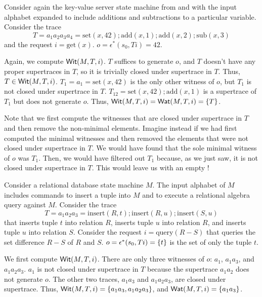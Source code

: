 \begin{example}
  \newcommand{\Mget}{\text{get}}
  \newcommand{\Mset}{\text{set}}
  \newcommand{\Madd}{\text{add}}
  \newcommand{\Msub}{\text{sub}}
  Consider again the key-value server state machine from
   and  with the input
  alphabet expanded to include additions and subtractions to a particular
  variable. Consider the trace
  \[
    T = a_1 a_2 a_3 a_4 = \Mset(x, 42); \Madd(x, 1); \Madd(x, 2); \Msub(x, 3)
  \]
  and the request $i = \Mget(x)$. $o = \epsilon^*(s_0, Ti) = 42$.

  Again, we compute $\textsf{Wit}(M, T, i)$. $T$ suffices to generate $o$, and $T$
  doesn't have any proper supertraces in $T$, so it is trivially closed under
  supertrace in $T$. Thus, $T \in \textsf{Wit}(M, T, i)$.
  $T_1 = a_1 = \Mset(x, 42)$ is the only other witness of $o$, but $T_1$ is not
  closed under supertrace in $T$. $T_{12} = \Mset(x, 42); \Madd(x, 1)$ is a
  supertrace of $T_1$ but does not generate $o$.
  Thus, $\textsf{Wit}(M, T, i) = \textsf{Wat}(M, T, i) = \{T\}$.

  Note that we first compute the witnesses that are closed under supertrace in
  $T$ and then remove the non-minimal elements. Imagine instead if we had first
  computed the minimal witnesses and then removed the elements that were not
  closed under supertrace in $T$. We would have found that the sole minimal
  witness of $o$ was $T_1$. Then, we would have filtered out $T_1$ because, as
  we just saw, it is not closed under supertrace in $T$. This would leave us
  with an empty \watprovenance{}!
\end{example}

\begin{example}
  \newcommand{\Mins}{\text{insert}}
  \newcommand{\Mquery}{\text{query}}
  Consider a relational database state machine $M$. The input alphabet of $M$
  includes commands to insert a tuple into $M$ and to execute a relational
  algebra query against $M$. Consider the trace
  \[
    T = a_1 a_2 a_3 = \Mins(R, t); \Mins(R, u); \Mins(S, u)
  \]
  that inserts tuple $t$ into relation $R$, inserts tuple $u$ into relation
  $R$, and inserts tuple $u$ into relation $S$. Consider the request $i =
  \Mquery(R - S)$ that queries the set difference $R - S$ of $R$ and $S$. $o =
  \epsilon^*(s_0, Ti) = \{t\}$ is the set of only the tuple $t$.

  We first compute $\textsf{Wit}(M, T, i)$. There are only three witnesses of $o$:
  $a_1$, $a_1a_3$, and $a_1a_2a_3$.  $a_1$ is not closed under supertrace in
  $T$ because the supertrace $a_1a_2$ does not generate $o$. The other two
  traces, $a_1a_3$ and $a_1a_2a_3$, are closed under supertrace. Thus, $\textsf{Wit}(M,
  T, i) = \{a_1a_3, a_1a_2a_3\}$, and $\textsf{Wat}(M, T, i) = \{a_1a_3\}$.
\end{example}

